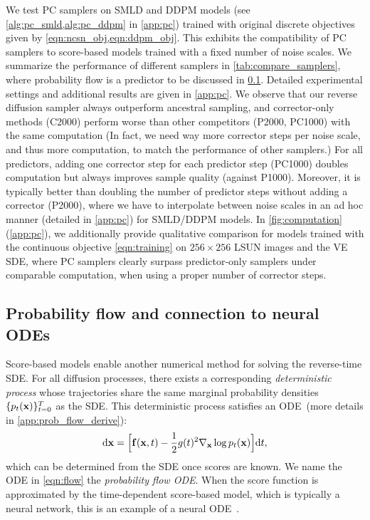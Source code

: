 We test PC samplers on SMLD and DDPM models (see \cref{alg:pc_smld,alg:pc_ddpm} in \cref{app:pc}) trained with original discrete objectives given by \cref{eqn:ncsn_obj,eqn:ddpm_obj}. %
This exhibits the compatibility of PC samplers to score-based models trained with a fixed number of noise scales. We summarize the performance of different samplers in \cref{tab:compare_samplers}, where probability flow is a predictor to be discussed in \cref{sec:flow}. Detailed experimental settings and additional results are given in \cref{app:pc}. We observe that our reverse diffusion sampler always outperform ancestral sampling, and corrector-only methods (C2000) perform worse than other competitors (P2000, PC1000) with the same computation (In fact, we need way more corrector steps per noise scale, and thus more computation, to match the performance of other samplers.) For all predictors, adding one corrector step for each predictor step (PC1000) doubles computation but always improves sample quality (against P1000). Moreover, it is typically better than doubling the number of predictor steps without adding a corrector (P2000), where we have to interpolate between noise scales in an ad hoc manner (detailed in \cref{app:pc}) for SMLD/DDPM models. In \cref{fig:computation} (\cref{app:pc}), we additionally provide qualitative comparison for models trained with the continuous objective \cref{eqn:training} on $256\times 256$ LSUN images and the VE SDE, where PC samplers clearly surpass predictor-only samplers under comparable computation, when using a proper number of corrector steps.








\subsection{Probability flow and connection to neural ODEs}\label{sec:flow}
Score-based models enable another numerical method for solving the reverse-time SDE. For all diffusion processes, there exists a corresponding \emph{deterministic process} whose trajectories share the same marginal probability densities $\{p_t(\mathbf{x})\}_{t=0}^T$ as the SDE. This deterministic process satisfies an ODE~(more details in \cref{app:prob_flow_derive}):
\begin{align}
    \mathrm{d} \mathbf{x} = \Big[\mathbf{f}(\mathbf{x}, t) - \frac{1}{2} g(t)^2\nabla_{\mathbf{x}} \log p_t(\mathbf{x})\Big] \mathrm{d} t, \label{eqn:flow}
\end{align}
which can be determined from the SDE once scores are known. We name the ODE in \cref{eqn:flow} the \emph{probability flow ODE}.
When the score function is approximated by the time-dependent score-based model, which is typically a neural network, this is an example of a neural ODE~\citep{chen2018neural}. 



